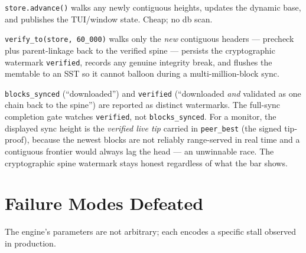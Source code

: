 \documentclass[11pt,a4paper]{article}
\newcommand{\code}[1]{\lstinline[basicstyle=\ttfamily\normalsize\color{codekw}]{#1}}
\begin{document}
\begin{description}[leftmargin=1.5em,style=nextline]
  \item[Fast periodic (150\,ms).] \code{store.advance()} walks any newly
        contiguous heights, updates the dynamic base, and publishes the TUI/window
        state. Cheap; no db scan.
  \item[Slow periodic (1.5\,s).] \code{verify_to(store, 60_000)} walks only the
        \emph{new} contiguous headers --- precheck plus parent-linkage back to the
        verified spine --- persists the cryptographic watermark
        \texttt{verified}, records any genuine integrity break, and flushes the
        memtable to an SST so it cannot balloon during a multi-million-block sync.
\end{description}

\noindent
\texttt{blocks\_synced} (``downloaded'') and \texttt{verified}
(``downloaded \emph{and} validated as one chain back to the spine'') are reported
as distinct watermarks. The full-sync completion gate watches \texttt{verified},
not \texttt{blocks\_synced}. For a monitor, the displayed sync height is the
\emph{verified live tip} carried in \texttt{peer\_best} (the signed tip-proof),
because the newest blocks are not reliably range-served in real time and a
contiguous frontier would always lag the head --- an unwinnable race. The
cryptographic spine watermark stays honest regardless of what the bar shows.

\section{Failure Modes Defeated}

The engine's parameters are not arbitrary; each encodes a specific stall observed
in production.
\end{document}
